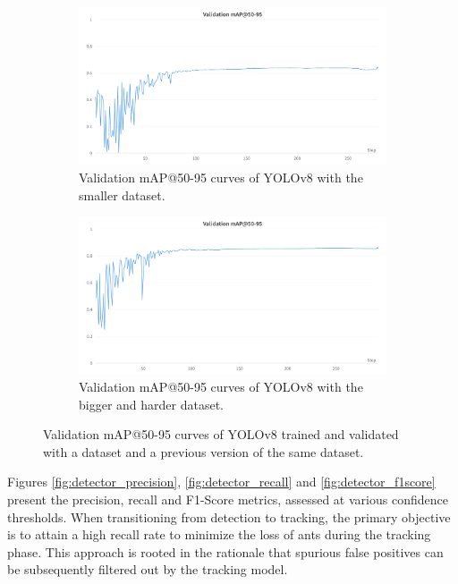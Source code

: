 \begin{figure}[!p]
	\centering
	\begin{subfigure}[]{0.45\textwidth}
		\includegraphics[width=\textwidth]{figures/06_results/mAP5095DetectorInitial.png}
		\caption{\footnotesize{Validation mAP@50-95 curves of YOLOv8 with the smaller dataset.}}
		\label{fig:validation mAP50-95 Initial}
	\end{subfigure}
	\begin{subfigure}[]{0.45\textwidth}
		\includegraphics[width=\textwidth]{figures/06_results/mAP5095Detector.png}
		\caption{\footnotesize{Validation mAP@50-95 curves of YOLOv8 with the bigger and harder dataset.}}
		\label{fig:validation mAP50-95 Final}
	\end{subfigure}
	
	\caption[Validation mAP@50-95 curves of YOLOv8]{\footnotesize{Validation mAP@50-95 curves of YOLOv8 trained and validated with a dataset and a previous version of the same dataset.}}
	\label{fig:validation mAP50-95}
\end{figure}

{
    Figures \ref{fig:detector_precision}, \ref{fig:detector_recall} and \ref{fig:detector_f1score} present the precision, recall and F1-Score metrics, assessed at various confidence thresholds. 
    When transitioning from detection to tracking, the primary objective is to attain a high recall rate to minimize the loss of ants during the tracking phase. This approach is rooted in the rationale that spurious false positives can be subsequently filtered out by the tracking model.
}

